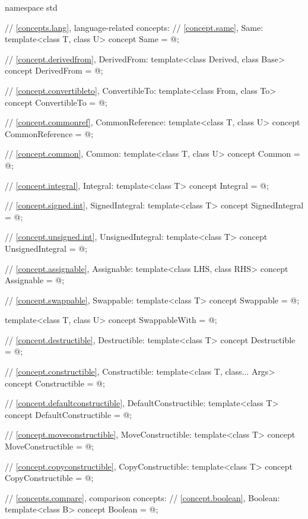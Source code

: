 %
\begin{codeblock}
namespace std {
  // \ref{concepts.lang}, language-related concepts:
  // \ref{concept.same}, Same:
  template<class T, class U>
  concept Same = @\seebelow@;

  // \ref{concept.derivedfrom}, DerivedFrom:
  template<class Derived, class Base>
  concept DerivedFrom = @\seebelow@;

  // \ref{concept.convertibleto}, ConvertibleTo:
  template<class From, class To>
  concept ConvertibleTo = @\seebelow@;

  // \ref{concept.commonref}, CommonReference:
  template<class T, class U>
  concept CommonReference = @\seebelow@;

  // \ref{concept.common}, Common:
  template<class T, class U>
  concept Common = @\seebelow@;

  // \ref{concept.integral}, Integral:
  template<class T>
  concept Integral = @\seebelow@;

  // \ref{concept.signed.int}, SignedIntegral:
  template<class T>
  concept SignedIntegral = @\seebelow@;

  // \ref{concept.unsigned.int}, UnsignedIntegral:
  template<class T>
  concept UnsignedIntegral = @\seebelow@;

  // \ref{concept.assignable}, Assignable:
  template<class LHS, class RHS>
  concept Assignable = @\seebelow@;

  // \ref{concept.swappable}, Swappable:
  template<class T>
  concept Swappable = @\seebelow@;

  template<class T, class U>
  concept SwappableWith = @\seebelow@;

  // \ref{concept.destructible}, Destructible:
  template<class T>
  concept Destructible = @\seebelow@;

  // \ref{concept.constructible}, Constructible:
  template<class T, class... Args>
  concept Constructible = @\seebelow@;

  // \ref{concept.defaultconstructible}, DefaultConstructible:
  template<class T>
  concept DefaultConstructible = @\seebelow@;

  // \ref{concept.moveconstructible}, MoveConstructible:
  template<class T>
  concept MoveConstructible = @\seebelow@;

  // \ref{concept.copyconstructible}, CopyConstructible:
  template<class T>
  concept CopyConstructible = @\seebelow@;

  // \ref{concepts.compare}, comparison concepts:
  // \ref{concept.boolean}, Boolean:
  template<class B>
  concept Boolean = @\seebelow@;

}
\end{codeblock}
